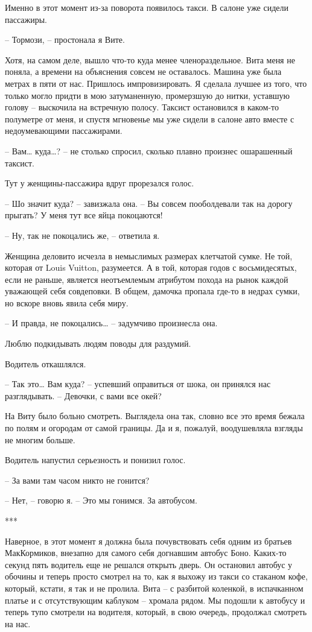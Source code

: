 \documentclass[
]{book}
\begin{document}
Именно в этот момент из-за поворота появилось такси. В салоне уже сидели пассажиры.

-- Тормози, -- простонала я Вите.

Хотя, на самом деле, вышло что-то куда менее членораздельное. Вита меня не поняла, а времени на объяснения совсем не оставалось. Машина уже была метрах в пяти от нас. Пришлось импровизировать. Я сделала лучшее из того, что только могло придти в мою затуманенную, промерзшую до нитки, уставшую голову -- выскочила на встречную полосу. Таксист остановился в каком-то полуметре от меня, и спустя мгновенье мы уже сидели в салоне авто вместе с недоумевающими пассажирами.

-- Вам\ldots{} куда\ldots? -- не столько спросил, сколько плавно произнес ошарашенный таксист.

Тут у женщины-пассажира вдруг прорезался голос.

-- Шо значит куда? -- завизжала она. -- Вы совсем пооболдевали так на дорогу прыгать? У меня тут все яйца покоцаются!

-- Ну, так не покоцались же, -- ответила я.

Женщина деловито исчезла в немыслимых размерах клетчатой сумке. Не той, которая от Louis Vuitton, разумеется. А в той, которая годов с восьмидесятых, если не раньше, является неотъемлемым атрибутом похода на рынок каждой уважающей себя совдеповки. В общем, дамочка пропала где-то в недрах сумки, но вскоре вновь явила себя миру.

-- И правда, не покоцались\ldots{} -- задумчиво произнесла она.

Люблю подкидывать людям поводы для раздумий.

Водитель откашлялся.

-- Так это\ldots{} Вам куда? -- успевший оправиться от шока, он принялся нас разглядывать. -- Девочки, с вами все окей?

На Виту было больно смотреть. Выглядела она так, словно все это время бежала по полям и огородам от самой границы. Да и я, пожалуй, воодушевляла взгляды не многим больше.

Водитель напустил серьезность и понизил голос.

-- За вами там часом никто не гонится?

-- Нет, -- говорю я. -- Это мы гонимся. За автобусом.

***

Наверное, в этот момент я должна была почувствовать себя одним из братьев МакКормиков, внезапно для самого себя догнавшим автобус Боно. Каких-то секунд пять водитель еще не решался открыть дверь. Он остановил автобус у обочины и теперь просто смотрел на то, как я выхожу из такси со стаканом кофе, который, кстати, я так и не пролила. Вита -- с разбитой коленкой, в испачканном платье и с отсутствующим каблуком -- хромала рядом. Мы подошли к автобусу и теперь тупо смотрели на водителя, который, в свою очередь, продолжал смотреть на нас.
\end{document}
